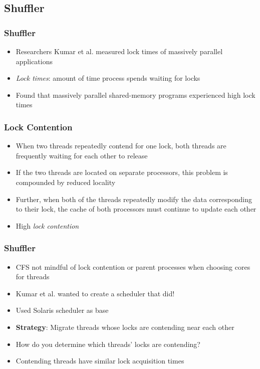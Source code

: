 \documentclass{beamer}
\newcommand{\linespace}{\vskip 0.25cm}
\begin{document}
\subsection{Shuffler}
\begin{frame}
\frametitle{Shuffler}

\begin{itemize}


\item Researchers Kumar et al. measured lock times of massively parallel applications
\item \emph{Lock times}: amount of time process spends waiting for locks

\linespace

\item Found that massively parallel shared-memory programs experienced high lock times


\end{itemize}

\end{frame}

\begin{frame}
\frametitle{Lock Contention}

\begin{itemize}



\item When two threads repeatedly contend for one lock, both threads are frequently waiting for each other to release
\linespace
\item If the two threads are located on separate processors, this problem is compounded by reduced locality
\linespace
\item Further, when both of the threads repeatedly modify the data corresponding to their lock, the cache of both processors must continue to update each other
\linespace
\item High \emph{lock contention}

\end{itemize}

\end{frame}


\begin{frame}
\frametitle{Shuffler}
\begin{itemize}
	\item CFS not mindful of lock contention or parent processes when choosing cores for threads
	
	\item Kumar et al. wanted to create a scheduler that did!
	\item Used Solaris scheduler as base
	\linespace
	\item \textbf{Strategy}: Migrate threads whose locks are contending near each other
	\linespace
	
	\item How do you determine which threads' locks are contending?
	\item Contending threads have similar lock acquisition times
	
\end{itemize}
\end{frame}
\end{document}
